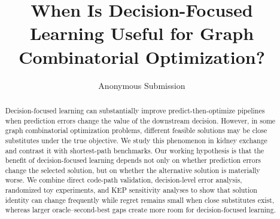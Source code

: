 \documentclass[letterpaper]{article}
\title{When Is Decision-Focused Learning Useful for Graph Combinatorial Optimization?}
\author{Anonymous Submission}
\begin{document}
\maketitle

\begin{abstract}
Decision-focused learning can substantially improve predict-then-optimize
pipelines when prediction errors change the value of the downstream decision.
However, in some graph combinatorial optimization problems, different feasible
solutions may be close substitutes under the true objective. We study this
phenomenon in kidney exchange and contrast it with shortest-path benchmarks.
Our working hypothesis is that the benefit of decision-focused learning depends
not only on whether prediction errors change the selected solution, but on
whether the alternative solution is materially worse. We combine direct
code-path validation, decision-level error analysis, randomized toy
experiments, and KEP sensitivity analyses to show that solution identity can
change frequently while regret remains small when close substitutes exist,
whereas larger oracle--second-best gaps create more room for
decision-focused learning.
\end{abstract}









\end{document}
